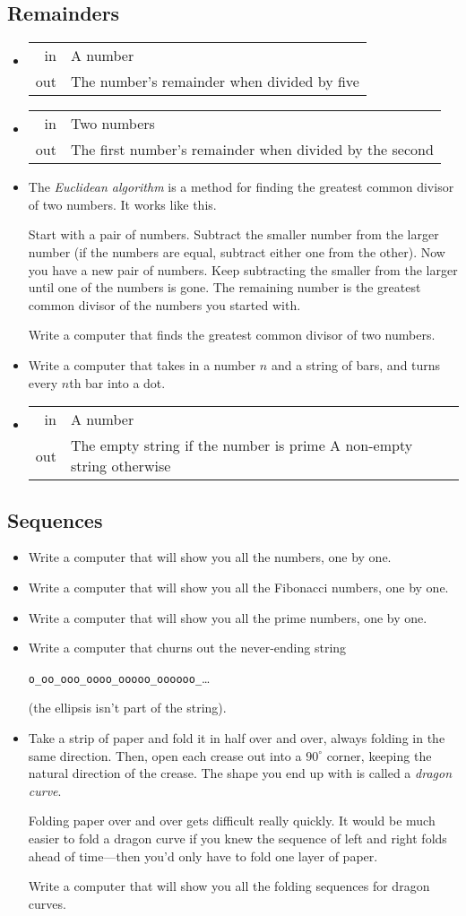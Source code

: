 \documentclass{article}
\newcommand*{\writeit}{\item[\NibRight]}
\newcommand{\spec}[1]{{\sc #1}}
\newcommand{\str}[1]{\texttt{#1}}
\begin{document}
\subsection*{Remainders}
\begin{itemize}
\writeit
\begin{tabular}{rl}
\spec{in} & A number \\
\spec{out} & The number's remainder when divided by five
\end{tabular}
\writeit
\begin{tabular}{rl}
\spec{in} & Two numbers \\
\spec{out} & The first number's remainder when divided by the second
\end{tabular}
\writeit
The {\em Euclidean algorithm} is a method for finding the greatest common divisor of two numbers. It works like this.

Start with a pair of numbers. Subtract the smaller number from the larger number (if the numbers are equal, subtract either one from the other). Now you have a new pair of numbers. Keep subtracting the smaller from the larger until one of the numbers is gone. The remaining number is the greatest common divisor of the numbers you started with.

Write a computer that finds the greatest common divisor of two numbers.
\writeit Write a computer that takes in a number $n$ and a string of bars, and turns every $n$th bar into a dot.
\writeit
\begin{tabularx}{\textwidth}{rX}
\spec{in} & A number \\
\spec{out} & The empty string if the number is prime \newline A non-empty string otherwise
\end{tabularx}
\end{itemize}
\subsection*{Sequences}
\begin{itemize}
\writeit Write a computer that will show you all the numbers, one by one.
\writeit Write a computer that will show you all the Fibonacci numbers, one by one.
\writeit Write a computer that will show you all the prime numbers, one by one.
\writeit
Write a computer that churns out the never-ending string
\begin{center}
\str{o\_oo\_ooo\_oooo\_ooooo\_oooooo\_}\quad\ldots
\end{center}
(the ellipsis isn't part of the string).
\writeit
Take a strip of paper and fold it in half over and over, always folding in the same direction. Then, open each crease out into a $90^\circ$ corner, keeping the natural direction of the crease. The shape you end up with is called a {\em dragon curve}.

Folding paper over and over gets difficult really quickly. It would be much easier to fold a dragon curve if you knew the sequence of left and right folds ahead of time---then you'd only have to fold one layer of paper.

Write a computer that will show you all the folding sequences for dragon curves.
\end{itemize}
\end{document}
